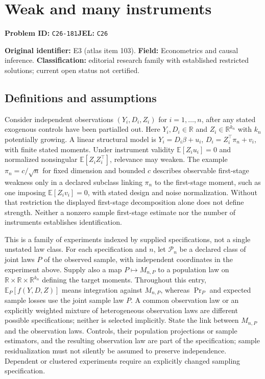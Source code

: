 \documentclass[11pt,a4paper]{article}
\begin{document}
\section*{Weak and many instruments}
\textbf{Problem ID:} \texttt{C26-181}\quad \textbf{JEL:} \texttt{C26}\par
\label{problem:OP-0103}
\label{atlas:prob:E3}

\noindent\textbf{Original identifier:} E3 (atlas item 103). \textbf{Field:} Econometrics and causal inference. \textbf{Classification:} editorial research family with established restricted solutions; current open status not certified.

\subsection*{Definitions and assumptions}

Consider independent observations $(Y_i,D_i,Z_i)$ for $i=1,\ldots,n$, after any stated exogenous controls have been partialled out. Here $Y_i,D_i\in\mathbb R$ and $Z_i\in\mathbb R^{k_n}$ with $k_n$ potentially growing. A linear structural model is $Y_i=D_i\beta+u_i$, $D_i=Z_i^\top\pi_n+v_i$, with finite stated moments. Under instrument validity $\mathbb E[Z_i u_i]=0$ and normalized nonsingular $\mathbb E[Z_iZ_i^\top]$, relevance may weaken. The example $\pi_n=c/\sqrt n$ for fixed dimension and bounded $c$ describes observable first-stage weakness only in a declared subclass linking $\pi_n$ to the first-stage moment, such as one imposing $\mathbb E[Z_i v_i]=0$, with stated design and noise normalization. Without that restriction the displayed first-stage decomposition alone does not define strength. Neither a nonzero sample first-stage estimate nor the number of instruments establishes identification.

This is a family of experiments indexed by supplied specifications, not a single unstated law class. For each specification and $n$, let $\mathcal P_n$ be a declared class of joint laws $P$ of the observed sample, with independent coordinates in the experiment above. Supply also a map $P\mapsto M_{n,P}$ to a population law on $\mathbb R\times\mathbb R\times\mathbb R^{k_n}$ defining the target moments. Throughout this entry, $\mathbb E_P[f(Y,D,Z)]$ means integration against $M_{n,P}$, whereas $\Pr_P$ and expected sample losses use the joint sample law $P$. A common observation law or an explicitly weighted mixture of heterogeneous observation laws are different possible specifications; neither is selected implicitly. State the link between $M_{n,P}$ and the observation laws. Controls, their population projections or sample estimators, and the resulting observation law are part of the specification; sample residualization must not silently be assumed to preserve independence. Dependent or clustered experiments require an explicitly changed sampling specification.
\end{document}
